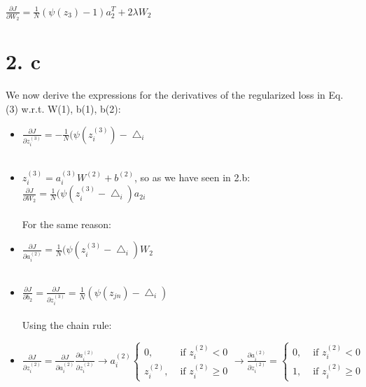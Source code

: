\documentclass[
	12pt, %
]{fphw}
\begin{document}
$\frac{\partial J}{\partial W_2} = \frac{1}{N} (\psi(z_3) - 1) a_{2}^{T} + 2\lambda W_2$


\newpage
\section* {2. c}

We now derive the expressions for the derivatives of the regularized loss in Eq. (3) w.r.t. W(1), b(1), b(2):\\


\begin{itemize}

\item $\frac{\partial J}{\partial z_{i}^{(3)}} = - \frac{1}{N} (\psi (z_{i}^{(3)}) - \bigtriangleup_i$ \\ \\

\item $z_{i}^{(3)} = a_{i}^{(3)} W^{(2)} + b^{(2)}$, so as we have seen in 2.b: \\ 

$\frac {\partial J}{\partial W_2} = \frac {1}{N} (\psi (z_{i}^{(3)} - \bigtriangleup_i) a_{2i} $\\ \\

For the same reason:

\item $\frac {\partial J}{\partial a_{i}^{(2)}} = \frac{1}{N} (\psi (z_{i}^{(3)} - \bigtriangleup_i) W_2$ \\	\\

\item $\frac {\partial J}{\partial b_2} = \frac {\partial J}{\partial z_{i}^{(3)}} = \frac{1}{N} (\psi(z_{jn}) - \bigtriangleup_i)$ \\ \\

Using the chain rule:

\item $\frac {\partial J}{\partial z_{i}^{(2)}} = \frac {\partial J}{\partial a_{i}^{(2)}} \frac {\partial a_{i}^{(2)}}{\partial z_{i}^{(2)}} \rightarrow a_{i}^{(2)}\left\{\begin{array}{ll}
0, & \text { if } z_{i}^{(2)}<0 \\
z_{i}^{(2)}, & \text { if } z_{i}^{(2)}\geq0
\end{array}\right.
\rightarrow \frac {\partial a_{i}^{(2)}}{\partial z_{i}^{(2)}} =
\left\{\begin{array}{ll}
0, & \text { if } z_{i}^{(2)}<0 \\
1, & \text { if } z_{i}^{(2)}\geq0
\end{array}\right.
$ \\ \\


\end{itemize}
\end{document}
